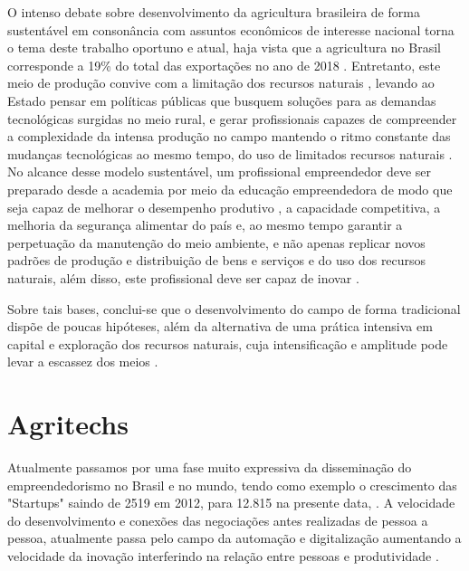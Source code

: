 O intenso debate sobre desenvolvimento da agricultura brasileira de forma sustentável em consonância com assuntos econômicos de interesse nacional torna o tema deste trabalho oportuno e atual, haja vista que a agricultura no Brasil corresponde a 19\% do total das exportações no ano de 2018 \cite{mdic_comex_2019}. Entretanto, este meio de produção convive com a limitação dos recursos naturais \cite{jacobi_meio_1999}, levando ao Estado pensar em políticas públicas que busquem soluções para as demandas tecnológicas surgidas no meio rural, e gerar profissionais capazes de compreender a complexidade da intensa produção no campo mantendo o ritmo constante das mudanças tecnológicas ao mesmo tempo, do uso de limitados recursos naturais \cite{costa_dinamica_2016}.
No alcance desse modelo sustentável, um profissional empreendedor deve ser preparado desde a academia por meio da educação empreendedora de modo que seja capaz de melhorar o desempenho produtivo \cite{da_silva_qualidade_2017}, a capacidade competitiva, a melhoria da segurança alimentar do país \cite{hoffmann_brasil_2014} e, ao mesmo tempo garantir a perpetuação da manutenção do meio ambiente, e não apenas replicar novos padrões de produção e distribuição de bens e serviços e do uso dos recursos naturais, além disso, este profissional deve ser capaz de inovar \cite{morais_empreendedorismo_2018}.

Sobre tais bases, conclui-se que o desenvolvimento do campo de forma tradicional dispõe de poucas hipóteses, além da alternativa de uma prática intensiva em capital e exploração dos recursos naturais, cuja intensificação e amplitude pode levar a escassez dos meios \cite{costa_agrarian_2016}. 




\section{Agritechs}

Atualmente passamos por uma fase muito expressiva da disseminação do empreendedorismo no Brasil e no mundo, tendo como exemplo o crescimento das "Startups" saindo de 2519 em 2012, para 12.815 na presente data, \cite{abstartups_startupbase_2019}. A velocidade do desenvolvimento e conexões das negociações antes realizadas de pessoa a pessoa, atualmente passa pelo campo da automação e digitalização aumentando a velocidade da inovação interferindo na relação entre pessoas e produtividade \cite{campos_o_2016}. 


